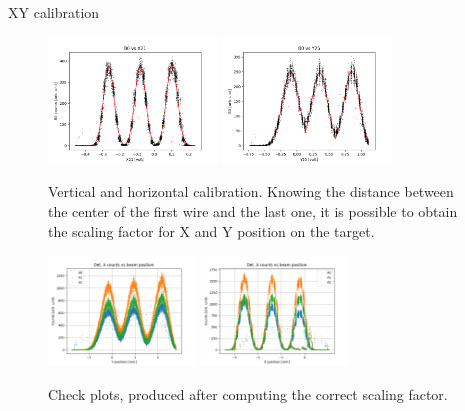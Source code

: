 \documentclass[8pt,a4paper]{beamer}
\begin{document}
\begin{frame}{XY calibration}

\begin{figure}[hbtp]
\centering
\includegraphics[width = 0.4\textwidth]{figures/HorizontalCalibration.png}
\includegraphics[width = 0.4\textwidth]{figures/VerticalCalibration.png} 
\caption{Vertical and horizontal calibration. Knowing the distance between the center of the first wire and the last one, it is possible to obtain the scaling factor for X and Y position on the target.}
\end{figure}

\begin{figure}[hbtp]
\centering
\includegraphics[width = 0.35\textwidth]{figures/YcheckA.png} 
\includegraphics[width = 0.35\textwidth]{figures/XcheckA.png}
\caption{Check plots, produced after computing the correct scaling factor.}
\end{figure}

 


\end{frame}
\end{document}
